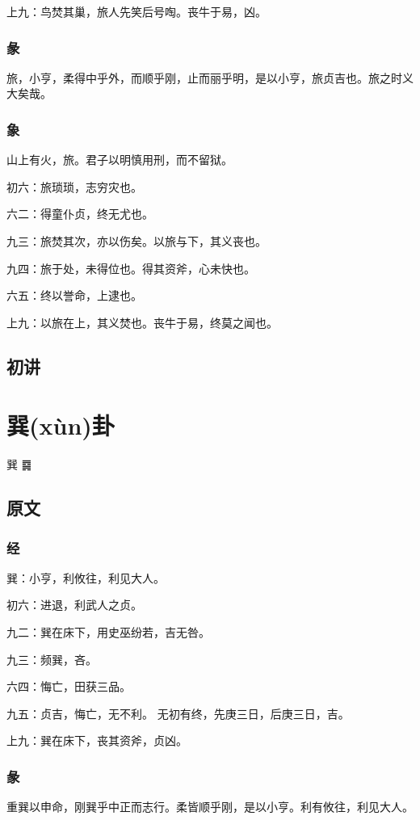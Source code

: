 \documentclass[12pt,oneside]{book}
\begin{document}
上九：鸟焚其巢，旅人先笑后号啕。丧牛于易，凶。

\subsection{彖}
旅，小亨，柔得中乎外，而顺乎刚，止而丽乎明，是以小亨，旅贞吉也。旅之时义大矣哉。

\subsection{象}
山上有火，旅。君子以明慎用刑，而不留狱。

初六：旅琐琐，志穷灾也。

六二：得童仆贞，终无尤也。

九三：旅焚其次，亦以伤矣。以旅与下，其义丧也。

九四：旅于处，未得位也。得其资斧，心未快也。

六五：终以誉命，上逮也。

上九：以旅在上，其义焚也。丧牛于易，终莫之闻也。

\section{初讲}


\chapter{巽(xùn)卦}
巽 {\Large ䷸}

\section{原文}

\subsection{经}
巽：小亨，利攸往，利见大人。

初六：进退，利武人之贞。

九二：巽在床下，用史巫纷若，吉无咎。

九三：频巽，吝。

六四：悔亡，田获三品。

九五：贞吉，悔亡，无不利。 无初有终，先庚三日，后庚三日，吉。

上九：巽在床下，丧其资斧，贞凶。

\subsection{彖}
重巽以申命，刚巽乎中正而志行。柔皆顺乎刚，是以小亨。利有攸往，利见大人。
\end{document}
